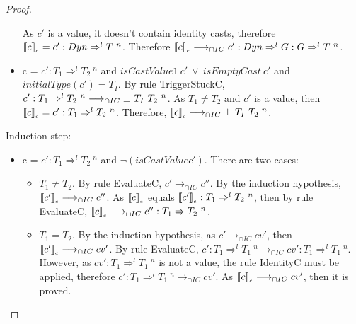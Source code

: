 \documentclass[a4paper]{article}
\begin{document}
\begin{proof}
\begin{itemize}
    As $c'$ is a value, it doesn't contain identity casts, therefore $\llbracket c \rrbracket_{_c} = c' : Dyn \Rightarrow^l T\ ^n$.
    Therefore $\llbracket c \rrbracket_{_c} \longrightarrow_{\cap IC} c' : Dyn \Rightarrow^l G : G \Rightarrow^l T\ ^n$.
    \item c = $c' : T_1 \Rightarrow^l T_2\ ^n$ and $isCastValue1\ c'\ \lor\ isEmptyCast\ c'$ and $initialType(c') = T_I$.
    By rule TriggerStuckC, $c' : T_1 \Rightarrow^l T_2\ ^n \longrightarrow_{\cap IC} \bot\ T_I\ T_2\ ^{n}$.
    As $T_1 \neq T_2$ and $c'$ is a value, then $\llbracket c \rrbracket_{_c} = c' : T_1 \Rightarrow^l T_2\ ^n$.
    Therefore, $\llbracket c \rrbracket_{_c} \longrightarrow_{\cap IC} \bot\ T_I\ T_2\ ^{n}$.
\end{itemize}
Induction step:
\begin{itemize}
    \item c = $c' : T_1 \Rightarrow^l T_2\ ^{n}$ and $\neg(isCastValue c')$.
    There are two cases:
    \begin{itemize}
        \item $T_1 \neq T_2$.
        By rule EvaluateC, $c' \longrightarrow_{\cap IC} c''$.
        By the induction hypothesis, $\llbracket c' \rrbracket_{_c} \longrightarrow_{\cap IC} c''$.
        As $\llbracket c \rrbracket_{_c}$ equals $\llbracket c' \rrbracket_{_c} : T_1 \Rightarrow^l T_2\ ^n$, then by rule EvaluateC, $\erasec{c} \longrightarrow_{\cap IC} c'' : T_1 \Rightarrow T_2\ ^n$.
        \item $T_1 = T_2$.
        By the induction hypothesis, as $c' \longrightarrow_{\cap IC} cv'$, then $\llbracket c' \rrbracket_{_c} \longrightarrow_{\cap IC} cv'$.
        By rule EvaluateC, $c' : T_1 \Rightarrow^l T_1\ ^n \longrightarrow_{\cap IC} cv' : T_1 \Rightarrow^l T_1\ ^n$.
        However, as $cv' : T_1 \Rightarrow^l T_1\ ^n$ is not a value, the rule IdentityC must be applied, therefore $c' : T_1 \Rightarrow^l T_1\ ^n \longrightarrow_{\cap IC} cv'$.
        As $\llbracket c \rrbracket_{_c} \longrightarrow_{\cap IC} cv'$, then it is proved.
    \end{itemize}
\end{itemize}
\end{proof}
\end{document}
